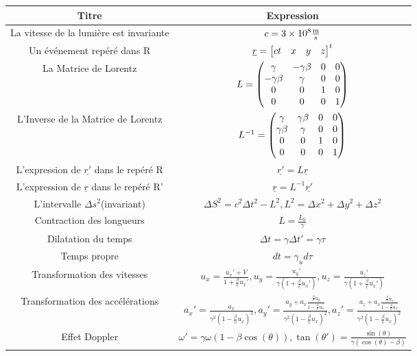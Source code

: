 \documentclass[french]{article}
\begin{document}
	\begin{center}
		\begin{tabular}{| c | c |}
			\hline
			\textbf{Titre} & \textbf{Expression}\\
			\hline
			La vitesse de la lumière est invariante&$c = 3\times10^8 \si{\frac{\meter}{\second}}$\\
			\hline
			Un événement repéré dans R&$ \underline{r}=\mqty[c t& x&y&z]^t $ \\
			\hline
			La Matrice de Lorentz &$L = \mqty(\gamma & -\gamma\beta & 0 & 0 \\ -\gamma\beta& \gamma&0&0\\0&0&1&0\\0&0&0&1)$\\
			\hline
			L'Inverse de la Matrice de Lorentz&$L^{-1} = \mqty(\gamma & \gamma\beta & 0 & 0 \\ \gamma\beta& \gamma&0&0\\0&0&1&0\\0&0&0&1)$\\
			\hline
			L'expression de $\underline{r'}$ dans le repéré R&$\underline{r'}=L\underline{r}$\\
			\hline
			L'expression de $\underline{r}$ dans le repéré R' &$\underline{r}=L^{-1}\underline{r'}$\\
			\hline
			L’intervalle $\Delta s ^2$(invariant)&$\Delta S^2=c^2 \Delta t ^2-L^2, L^2=\Delta x ^2 +\Delta y ^2 + \Delta z ^2$\\
		\hline
		Contraction des longueurs&$L=\frac{L_0}{\gamma}$\\
		\hline
	        Dilatation du temps&$\Delta t = \gamma \Delta t' = \gamma \tau$  \\
		\hline
		Temps propre& $dt=\gamma_ud\tau$\\
		\hline
		Transformation des vitesses&$u_x = \frac{u_x'+V}{1 +\frac{\beta}{c}u_x'},
				 u_y = \frac{u_y'}{\gamma(1 +\frac{\beta}{c}u_x')}, 
				 u_z = \frac{u_z'}{\gamma(1 +\frac{\beta}{c}u_x')}$\\
		\hline
Transformation des accélérations&
	$a_x' = \frac{a_x}{\gamma^3\left(1 - \frac{\beta}{c}u_x\right)^3},
	a_y' = \frac{a_y + a_x \frac{\frac{\beta}{c}u_y}{1-\frac{\beta}{c}u_x}}{\gamma ^2\left(1-\frac{\beta}{c}u_x\right)^2}, 
		a_z' = \frac{a_z + a_x \frac{\frac{\beta}{c}u_z}{1-\frac{\beta}{c}u_x}}{\gamma ^2\left(1-\frac{\beta}{c}u_x\right)^2}$	
\\
\hline
Effet Doppler&$\omega'=\gamma\omega\left(1-\beta\cos(\theta)\right),
	\tan(\theta')= \frac{\sin(\theta)}{\gamma\left(\cos(\theta)-\beta\right)}$\\

\end{tabular}
\end{center}
\end{document}
